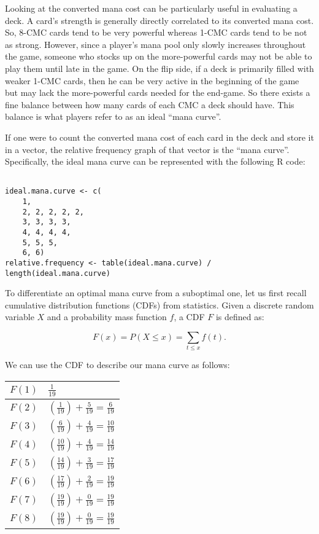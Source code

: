 \documentclass[12pt, letterpaper]{article}
\begin{document}
Looking at the converted mana cost can be particularly useful in evaluating a deck.
A card's strength is generally directly correlated to its converted mana cost.
So, 8-CMC cards tend to be very powerful
whereas 1-CMC cards tend to be not as strong.
However, since a player's mana pool only slowly increases throughout the game,
someone who stocks up on the more-powerful cards may not be able to play them until late in the game.
On the flip side, if a deck is primarily filled with weaker 1-CMC cards,
then he can be very active in the beginning of the game
but may lack the more-powerful cards needed for the end-game.
So there exists a fine balance between how many cards of each CMC a deck should have.
This balance is what players refer to as an ideal \enquote{mana curve}.

If one were to count the converted mana cost of each card in the deck and store it in a vector,
the relative frequency graph of that vector is the \enquote{mana curve}.
Specifically, the ideal mana curve can be represented with the following R code:

\begin{verbatim}

ideal.mana.curve <- c(
    1,
    2, 2, 2, 2, 2,
    3, 3, 3, 3,
    4, 4, 4, 4,
    5, 5, 5,
    6, 6)
relative.frequency <- table(ideal.mana.curve) / length(ideal.mana.curve)

\end{verbatim}

To differentiate an optimal mana curve from a suboptimal one,
let us first recall cumulative distribution functions (CDFs) from statistics.
Given a discrete random variable $ X $ and a probability mass function $ f $,
a CDF $ F $ is defined as:

$$
F(x) = P(X \le x) = \sum_{t \le x} f(t).
$$

We can use the CDF to describe our mana curve as follows:

\begin{tabular}{|l|l|}
\hline

$ F(1) $ & $ \frac{1}{19} $ \\ \hline
$ F(2) $ & $ (\frac{1}{19}) + \frac{5}{19} = \frac{6}{19} $ \\ \hline
$ F(3) $ & $ (\frac{6}{19}) + \frac{4}{19} = \frac{10}{19} $ \\ \hline
$ F(4) $ & $ (\frac{10}{19}) + \frac{4}{19} = \frac{14}{19} $ \\ \hline
$ F(5) $ & $ (\frac{14}{19}) + \frac{3}{19} = \frac{17}{19} $ \\ \hline
$ F(6) $ & $ (\frac{17}{19}) + \frac{2}{19} = \frac{19}{19} $ \\ \hline
$ F(7) $ & $ (\frac{19}{19}) + \frac{0}{19} = \frac{19}{19} $ \\ \hline
$ F(8) $ & $ (\frac{19}{19}) + \frac{0}{19} = \frac{19}{19} $ \\ \hline

\end{tabular}
\end{document}
